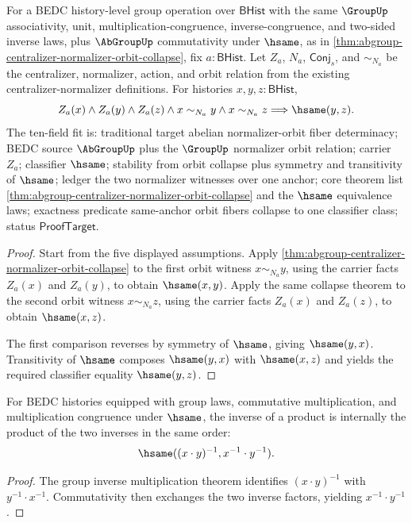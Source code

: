 \begin{theorem}
\label{thm:abgroup-centralizer-normalizer-orbit-fiber-determinacy}
For a BEDC history-level group operation over $\mathsf{BHist}$ with the same
$\GroupUp$ associativity, unit, multiplication-congruence, inverse-congruence,
and two-sided inverse laws, plus $\AbGroupUp$ commutativity under $\hsame$, as in
\autoref{thm:abgroup-centralizer-normalizer-orbit-collapse}, fix
$a:\mathsf{BHist}$. Let $Z_a$, $N_a$, $\mathsf{Conj}_s$, and $\sim_{N_a}$ be the
centralizer, normalizer, action, and orbit relation from the existing
centralizer-normalizer definitions. For histories $x,y,z:\mathsf{BHist}$,
$$
Z_a(x)\land Z_a(y)\land Z_a(z)\land x\sim_{N_a}y\land x\sim_{N_a}z
\Longrightarrow
\hsame(y,z).
$$
The ten-field fit is: traditional target abelian normalizer-orbit fiber
determinacy; BEDC source $\AbGroupUp$ plus the $\GroupUp$ normalizer orbit
relation; carrier $Z_a$; classifier $\hsame$; stability from orbit collapse plus
symmetry and transitivity of $\hsame$; ledger the two normalizer witnesses over
one anchor; core theorem list
\autoref{thm:abgroup-centralizer-normalizer-orbit-collapse} and the $\hsame$
equivalence laws; exactness predicate same-anchor orbit fibers collapse to one
classifier class; status $\mathsf{ProofTarget}$.
\end{theorem}
\begin{proof}
Start from the five displayed assumptions. Apply
\autoref{thm:abgroup-centralizer-normalizer-orbit-collapse} to the first orbit
witness $x\sim_{N_a}y$, using the carrier facts $Z_a(x)$ and $Z_a(y)$, to obtain
$\hsame(x,y)$. Apply the same collapse theorem to the second orbit witness
$x\sim_{N_a}z$, using the carrier facts $Z_a(x)$ and $Z_a(z)$, to obtain
$\hsame(x,z)$.

The first comparison reverses by symmetry of $\hsame$, giving $\hsame(y,x)$.
Transitivity of $\hsame$ composes $\hsame(y,x)$ with $\hsame(x,z)$ and yields
the required classifier equality $\hsame(y,z)$.
\end{proof}

\begin{theorem}
\label{thm:abgroup-inverse-mul}
For BEDC histories equipped with group laws, commutative multiplication, and
multiplication congruence under $\hsame$, the inverse of a product is
internally the product of the two inverses in the same order:
$$
\hsame((x\cdot y)^{-1},x^{-1}\cdot y^{-1}).
$$
\end{theorem}
\begin{proof}
The group inverse multiplication theorem identifies $(x\cdot y)^{-1}$ with
$y^{-1}\cdot x^{-1}$. Commutativity then exchanges the two inverse factors,
yielding $x^{-1}\cdot y^{-1}$.
\end{proof}


